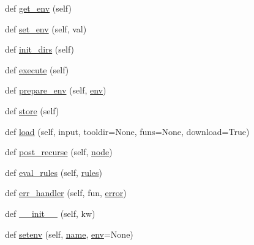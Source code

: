 \begin{DoxyCompactItemize}
\item 
def \hyperlink{classwaflib_1_1_configure_1_1_configuration_context_a5f2dfad34690147826b09413246140f7}{get\+\_\+env} (self)
\item 
def \hyperlink{classwaflib_1_1_configure_1_1_configuration_context_ad30b269279dd9c24e6d892bb3b2fc583}{set\+\_\+env} (self, val)
\item 
def \hyperlink{classwaflib_1_1_configure_1_1_configuration_context_a782925b68e221c10f8e08433329364c9}{init\+\_\+dirs} (self)
\item 
def \hyperlink{classwaflib_1_1_configure_1_1_configuration_context_a2dadcc441cc31bb49159c709bae0ec32}{execute} (self)
\item 
def \hyperlink{classwaflib_1_1_configure_1_1_configuration_context_a913063288a6135c3105acf180e7f0f0c}{prepare\+\_\+env} (self, \hyperlink{classwaflib_1_1_configure_1_1_configuration_context_a390267f6d3529fe07447ffb4925ca533}{env})
\item 
def \hyperlink{classwaflib_1_1_configure_1_1_configuration_context_aadaed27da973f44dde6eaa890026be35}{store} (self)
\item 
def \hyperlink{classwaflib_1_1_configure_1_1_configuration_context_ae13e6fac1db3060edb50337f97b7be3f}{load} (self, input, tooldir=None, funs=None, download=True)
\item 
def \hyperlink{classwaflib_1_1_configure_1_1_configuration_context_a9620736938604c56dc26964b06a24e2e}{post\+\_\+recurse} (self, \hyperlink{structnode}{node})
\item 
def \hyperlink{classwaflib_1_1_configure_1_1_configuration_context_af1b5fdd6d958f8b996dba916c44ec9fa}{eval\+\_\+rules} (self, \hyperlink{classwaflib_1_1_configure_1_1_configuration_context_a279ad5a7c2630c4416afc36cad85a2db}{rules})
\item 
def \hyperlink{classwaflib_1_1_configure_1_1_configuration_context_acc349b079382fdac3d626eb46bd54b7e}{err\+\_\+handler} (self, fun, \hyperlink{sndfile__save_8m_ada4b423bc19e6ff5c5b514e55f518a82}{error})
\item 
def \hyperlink{classwaflib_1_1_configure_1_1_configuration_context_a0f139855aa53920d6f30a05e10253ab0}{\+\_\+\+\_\+init\+\_\+\+\_\+} (self, kw)
\item 
def \hyperlink{classwaflib_1_1_configure_1_1_configuration_context_a2ed4960105cdf08c13cd178367ae1818}{setenv} (self, \hyperlink{lib_2expat_8h_a1b49b495b59f9e73205b69ad1a2965b0}{name}, \hyperlink{classwaflib_1_1_configure_1_1_configuration_context_a390267f6d3529fe07447ffb4925ca533}{env}=None)
\item 

\end{DoxyCompactItemize}
